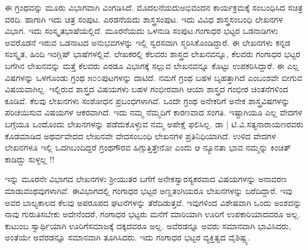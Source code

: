 {ಈ ಗ್ರಂಥವನ್ನು ಮೂರು ವಿಭಾಗವಾಗಿ ವಿಂಗಡಿಸಿದೆ. ಮೊದಲನೆಯದು\break ಅಭಿವಂದನ ಕಾರ್ಯಕ್ರಮಕ್ಕೆ ಸಂಬಂಧಿಸಿದ ಸಚಿತ್ರ ವರದಿ. ಹಾಗಾಗಿ ಇದು ಚಿತ್ರ ಸಂಪುಟ. ಎರಡನೆಯದು ಶಾಸ್ತ್ರಸಂಪುಟ. ಇದು ವಿವಿಧ ಶಾಸ್ತ್ರಸಂಬಂಧಿ ಲೇಖನಗಳ ವಿಭಾಗ. ಇದು ಸಂಸ್ಕೃತಭಾಷೆಯಲ್ಲಿದೆ. ಮೂರನೆಯದು  ಒಳನುಡಿ ಸಂಪುಟ.\break ಗಂಗಾಧರ ಭಟ್ಟರ ಒಡನಾಡಿಗಳು ಅವರೊಡನೆ ಇರುವ ಒಡನಾಟದ ಅನುಭವಗಳನ್ನು ಇಲ್ಲಿ ಸ್ವರಸವಾಗಿ ಸ್ಮರಿಸಿಕೊಂಡಿದ್ದಾರೆ. ಈ ಲೇಖನಗಳು ಕನ್ನಡ ಸಂಸ್ಕೃತ, ಹಿಂದಿ ಇಂಗ್ಲಿಷ್ ಭಾಷೆಗಳಲ್ಲಿವೆ. ಲೇಖಕರಲ್ಲಿ ಕೆಲವರು ಶಾಸ್ತ್ರದ ಲೇಖನವನ್ನೂ, ಕೆಲವರು ಗಂಗಾಧರ ಭಟ್ಟರ ಬಗೆಗಿನ ಲೇಖನವನ್ನು ಮತ್ತೆ ಕೆಲವರು ಎರಡೂ ವಿಭಾಗಕ್ಕೆ ಸಲ್ಲುವ ಲೇಖನವನ್ನೂ ಕೊಟ್ಟು ಉಪಕರಿಸಿದ್ದಾರೆ. ಈ ಎಲ್ಲ ವಿಷಗಳನ್ನು ಒಳಗೊಂಡು ಗ್ರಂಥ ೫೦೦ಪುಟಗಳನ್ನು ದಾಟಿದೆ. ನಮಗೆ ಗ್ರಂಥ ಬಹಳ ಬೃಹತ್ತಾಗಿದೆ ಎಂಬಂಶವೇ ಬೀಗುವ ವಿಷಯವಾಗಿಲ್ಲ. ಇಲ್ಲಿರುವ ಶಾಸ್ತ್ರದ ವಿಷಯಗಳು ಬಹಳ ಗಂಭೀರವಾಗಿ ಆಯಾ ಶಾಸ್ತ್ರದ ಗಂಭೀರ ಚಿಂತನೆಗಳಿಂದ ಕೂಡಿವೆ. ಕೆಲವು ಲೇಖನಗಳು ಸಂಶೋಧನ ಪ್ರಬಂಧಗಳಾಗಿವೆ. ಒಂದೇ ಗ್ರಂಥ ಅನೇಕರಿಗೆ ಅನೇಕ ಶಾಸ್ತ್ರವಿಷಗಳನ್ನು ಪರಿಚಯಿಸುವ ವಿಷಯಗಳ ಆಕರವಾಗಿದೆ. ಇದು ನಮ್ಮ ನೆಮ್ಮದಿಗೆ ಕಾರಣವಾದ ಸಂಗತಿ. ಇಷ್ಟಾಗಿಯೂ ಎಲ್ಲ ವೇದಗಳ ಬಗ್ಗೆಯೂ ಒಂದೊಂದು ಲೇಖನಗಳನ್ನು ಪಡೆದುಕೊಳ್ಳುವ ನಮ್ಮ ಅಪೇಕ್ಷೆ ಫಲಿಸಿಲ್ಲ. ಡಾ | ಟಿ.ವಿ.ಸತ್ಯನಾರಾಯಣರವರು ಕೊಡಮಾಡಿದ ಅಥರ್ವವೇದದ ಲೇಖನವೇ ವೇದಸಂಬಂಧಿ ಲೇಖನಗಳ ಪ್ರತಿನಿಧಿಯಾಗಿದೆ. ಉಳಿದ ವೇದಗಳ ಲೇಖನಗಳೂ ಇಲ್ಲಿ ಒದಗಿಬಂದಿದ್ದರೆ ಗ್ರಂಥಗೌರವ ಹಿಗ್ಗುತ್ತಿತ್ತೇನೋ ಎಂದು ಆ ನ್ಯೂನತಾ ಭಾವ ನಮ್ಮನ್ನು ಕಿಂಚಿತ್ ಕಾಡಿದ್ದು ಸುಳ್ಳಲ್ಲ !!  

ಇನ್ನು ಮೂರನೇ ವಿಭಾಗದ ಲೇಖನಗಳು ಶ್ರೀಯುತರ ಬಗೆಗೆ ಅನೇಕ\break ಸ್ವಾರಸ್ಯಕರವಾದ ವಿಷಯಗಳನ್ನು ಅನಾವರಣ ಮಾಡುವಂಥವುಗಳಾಗಿವೆ. ಈ\break ವಿಭಾಗದಲ್ಲಿ ಗಂಗಾಧರ ಭಟ್ಟರ ಅಣ್ಣತಂಗಿಯರೂ ಲೇಖನಗಳನ್ನು ಬರೆದಿದ್ದಾರೆ. ಇವು ಅವರ ಬಾಲ್ಯಕಾಲದ ಕೆಲವು ಅಪರೂಪದ ಘಟನೆಗಳನ್ನು ತೆರೆದಿಡುತ್ತವೆ. ಇವುಗಳಿಂದ ವಿಶೇಷವಾಗಿ ಒಂದು ಅಂಶವನ್ನು ನಾವು ಗುರುತಿಸಬೇಕು \enginline{-} ಅದೇನೆಂದರೆ, ಗಂಗಾಧರ ಭಟ್ಟರು ಮನೆಗೆ ಮಾರಿಯಾಗಿ ಊರಿಗೆ ಉಪಕಾರಿಯಾದವರೂ ಅಲ್ಲ. ಕುಟುಂಬ ಸ್ವಾರ್ಥಿಯಾಗಿ ಊರಿಗೆ\enginline{-}ಸಮಾಜಕ್ಕೆ ದಕ್ಕದವರೂ ಅಲ್ಲ. ಅವೆರಡನ್ನೂ ಅವರು ಸಮಾನವಾಗಿ ಭಾವಿಸಿದರು, ಅಂತೆಯೇ ಅವೆರಡನ್ನೂ ಸಮಾನವಾಗಿ ತೂಗಿಸಿದರು. ಇದು ಗಂಗಾಧರ ಭಟ್ಟರ ವ್ಯಕ್ತಿತ್ವದ ವೈಶಿಷ್ಟ್ಯ.

}

